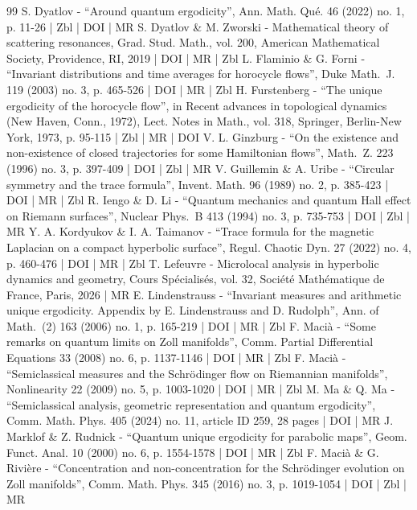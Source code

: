 \documentclass[10pt]{amsart}
\theoremstyle{plain}
\theoremstyle{definition}
\begin{document}
\begin{thebibliography}{99}
S. Dyatlov - “Around quantum ergodicity”, Ann. Math. Qué. 46 (2022) no. 1, p. 11-26 | Zbl | DOI | MR
S. Dyatlov \& M. Zworski - Mathematical theory of scattering resonances, Grad. Stud. Math., vol. 200, American Mathematical Society, Providence, RI, 2019 | DOI | MR | Zbl
L. Flaminio \& G. Forni - “Invariant distributions and time averages for horocycle flows”, Duke Math. J. 119 (2003) no. 3, p. 465-526 | DOI | MR | Zbl
H. Furstenberg - “The unique ergodicity of the horocycle flow”, in Recent advances in topological dynamics (New Haven, Conn., 1972), Lect. Notes in Math., vol. 318, Springer, Berlin-New York, 1973, p. 95-115 | Zbl | MR | DOI
V. L. Ginzburg - “On the existence and non-existence of closed trajectories for some Hamiltonian flows”, Math. Z. 223 (1996) no. 3, p. 397-409 | DOI | Zbl | MR
V. Guillemin \& A. Uribe - “Circular symmetry and the trace formula”, Invent. Math. 96 (1989) no. 2, p. 385-423 | DOI | MR | Zbl
R. Iengo \& D. Li - “Quantum mechanics and quantum Hall effect on Riemann surfaces”, Nuclear Phys. B 413 (1994) no. 3, p. 735-753 | DOI | Zbl | MR
Y. A. Kordyukov \& I. A. Taimanov - “Trace formula for the magnetic Laplacian on a compact hyperbolic surface”, Regul. Chaotic Dyn. 27 (2022) no. 4, p. 460-476 | DOI | MR | Zbl
T. Lefeuvre - Microlocal analysis in hyperbolic dynamics and geometry, Cours Spécialisés, vol. 32, Société Mathématique de France, Paris, 2026 | MR
E. Lindenstrauss - “Invariant measures and arithmetic unique ergodicity. Appendix by E. Lindenstrauss and D. Rudolph”, Ann. of Math. (2) 163 (2006) no. 1, p. 165-219 | DOI | MR | Zbl
F. Macià - “Some remarks on quantum limits on Zoll manifolds”, Comm. Partial Differential Equations 33 (2008) no. 6, p. 1137-1146 | DOI | MR | Zbl
F. Macià - “Semiclassical measures and the Schrödinger flow on Riemannian manifolds”, Nonlinearity 22 (2009) no. 5, p. 1003-1020 | DOI | MR | Zbl
M. Ma \& Q. Ma - “Semiclassical analysis, geometric representation and quantum ergodicity”, Comm. Math. Phys. 405 (2024) no. 11, article ID 259, 28 pages | DOI | MR
J. Marklof \& Z. Rudnick - “Quantum unique ergodicity for parabolic maps”, Geom. Funct. Anal. 10 (2000) no. 6, p. 1554-1578 | DOI | MR | Zbl
F. Macià \& G. Rivière - “Concentration and non-concentration for the Schrödinger evolution on Zoll manifolds”, Comm. Math. Phys. 345 (2016) no. 3, p. 1019-1054 | DOI | Zbl | MR

\end{thebibliography}
\end{document}
